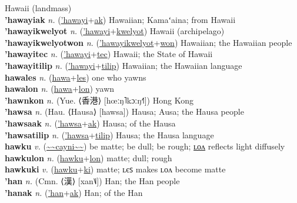 Hawaii (landmass) \label{'hawayi} \\
\textbf{'hawayiak} \textit{n.} (\hyperref['hawayi]{'hawayi}+\hyperref[ak]{ak})
Hawaiian; Kamaʻaina; from Hawaii \label{'hawayiak} \\
\textbf{'hawayikwelyot} \textit{n.} (\hyperref['hawayi]{'hawayi}+\hyperref[kwelyot]{kwelyot})
Hawaii (archipelago) \label{'hawayikwelyot} \\
\textbf{'hawayikwelyotwon} \textit{n.} (\hyperref['hawayikwelyot]{'hawayikwelyot}+\hyperref[won]{won})
Hawaiian; the Hawaiian people \label{'hawayikwelyotwon} \\
\textbf{'hawayitec} \textit{n.} (\hyperref['hawayi]{'hawayi}+\hyperref[tec]{tec})
Hawaii; the State of Hawaii \label{'hawayitec} \\
\textbf{'hawayitilip} \textit{n.} (\hyperref['hawayi]{'hawayi}+\hyperref[tilip]{tilip})
Hawaiian; the Hawaiian language \label{'hawayitilip} \\
\textbf{hawales} \textit{n.} (\hyperref[hawa]{hawa}+\hyperref[les]{les})
one who yawns \label{hawales} \\
\textbf{hawalon} \textit{n.} (\hyperref[hawa]{hawa}+\hyperref[lon]{lon})
yawn \label{hawalon} \\
\textbf{'hawnkon} \textit{n.} (Yue. ⟨香港⟩ [hœːŋ˥kɔːŋ˧˥])
Hong Kong \label{'hawnkon} \\
\textbf{'hawsa} \textit{n.} (Hau. ⟨Hausa⟩ [hawsa])
Hausa; Ausa; the Hausa people \label{'hawsa} \\
\textbf{'hawsaak} \textit{n.} (\hyperref['hawsa]{'hawsa}+\hyperref[ak]{ak})
Hausa; of the Hausa \label{'hawsaak} \\
\textbf{'hawsatilip} \textit{n.} (\hyperref['hawsa]{'hawsa}+\hyperref[tilip]{tilip})
Hausa; the Hausa language \label{'hawsatilip} \\
\textbf{hawku} \textit{v.} (\hyperref[cayni]{\~{}\~{}cayni\~{}\~{}})
be matte; be dull; be rough; \hyperref[hawkulon]{ʟᴏᴧ} reflects light diffusely \label{hawku} \\
\textbf{hawkulon} \textit{n.} (\hyperref[hawku]{hawku}+\hyperref[lon]{lon})
matte; dull; rough \label{hawkulon} \\
\textbf{hawkuki} \textit{v.} (\hyperref[hawku]{hawku}+\hyperref[ki]{ki})
matte; ʟєꜱ makes ʟᴏᴧ become matte \label{hawkuki} \\
\textbf{'han} \textit{n.} (Cmn. ⟨漢⟩ [xan˥˩])
Han; the Han people \label{'han} \\
\textbf{'hanak} \textit{n.} (\hyperref['han]{'han}+\hyperref[ak]{ak})
Han; of the Han \label{'hanak} \\
